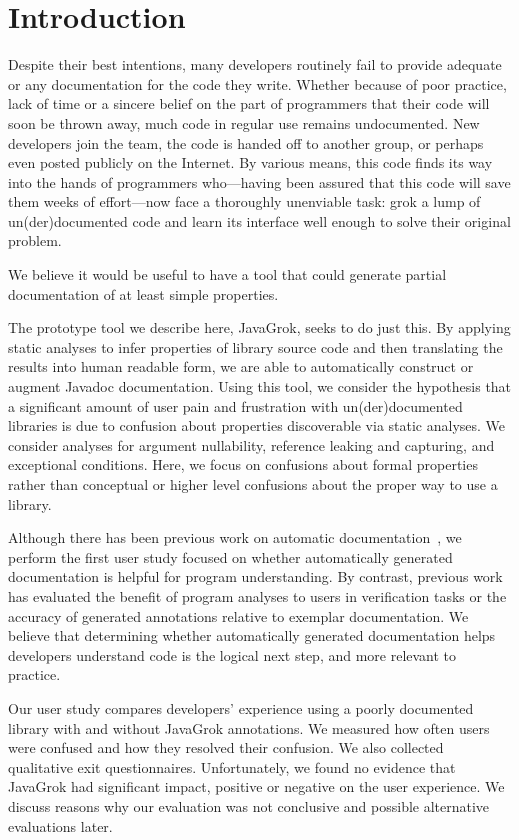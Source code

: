 \section{Introduction}

Despite their best intentions, many developers routinely fail to provide
adequate or any documentation for the code they write.  Whether because of poor
practice, lack of time or a sincere belief on the part of programmers that their
code will soon be thrown away, much code in regular use remains undocumented.
New developers join the team, the code is handed off to another group, or
perhaps even posted publicly on the Internet.  By various means, this code
finds its way into the hands of programmers who---having been assured that this
code will save them weeks of effort---now face a thoroughly unenviable task:
grok a lump of un(der)documented code and learn its interface well enough
to solve their original problem.

We believe it would be useful to have a tool that could generate partial
documentation of at least simple properties.

The prototype tool we describe here, JavaGrok, seeks to do just this.  By
applying static analyses to infer properties of library source code and then
translating the results into human readable form, we are able to
automatically construct or augment Javadoc documentation.
Using this tool, we
consider the hypothesis that a significant amount of user pain and frustration
with un(der)documented libraries is due to confusion about
properties discoverable via static analyses. We consider analyses for argument nullability,
reference leaking and capturing, and exceptional conditions.
Here, we focus on confusions about formal properties
rather than conceptual
or higher level confusions about the proper way to use a library.

Although there has been previous work on automatic
documentation~\cite{autodoc}, we perform the first user study
focused on whether automatically generated documentation is helpful for program
understanding.  By contrast, previous work~\cite{autodoc, Nimmer2002} has
evaluated the benefit of program analyses to users in verification tasks or the
accuracy of generated annotations relative to exemplar documentation.
We believe that determining whether automatically generated documentation helps
developers understand code is the logical next step, and more relevant to practice.

Our user study compares developers'
experience using a poorly documented library with and without JavaGrok
annotations.  We measured how often users were confused and how they resolved their confusion.  We also collected qualitative exit
questionnaires.  Unfortunately, we found no evidence that JavaGrok had
significant impact, positive or negative on the user experience.  We discuss
reasons why our evaluation was not conclusive and possible alternative
evaluations later.
